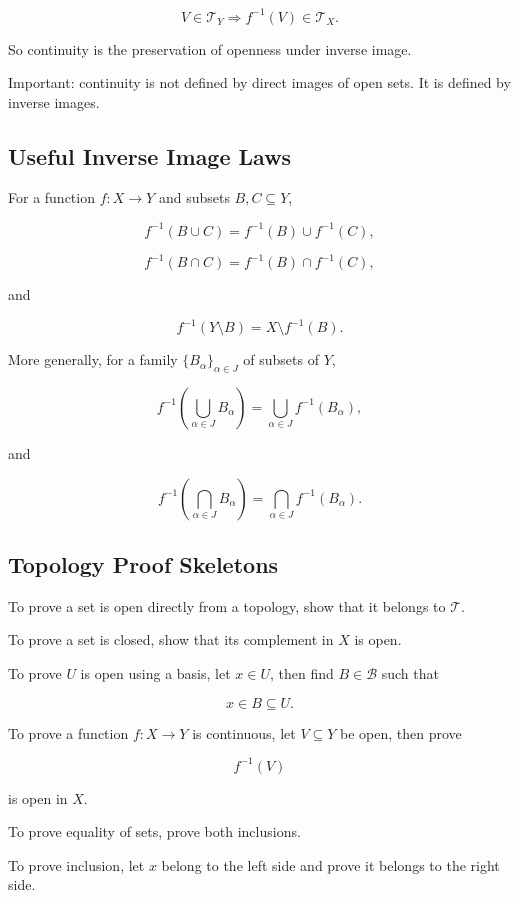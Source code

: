 \documentclass{article}
\begin{document}
	$$
	V\in\mathcal{T}_Y
	\Rightarrow
	f^{-1}(V)\in\mathcal{T}_X.
	$$
	
	So continuity is the preservation of openness under inverse image.
	
	Important: continuity is not defined by direct images of open sets. It is defined by inverse images.
	
	\subsection{Useful Inverse Image Laws}
	
	For a function \(f:X\to Y\) and subsets \(B,C\subseteq Y\),
	
	$$
	f^{-1}(B\cup C)=f^{-1}(B)\cup f^{-1}(C),
	$$
	
	$$
	f^{-1}(B\cap C)=f^{-1}(B)\cap f^{-1}(C),
	$$
	
	and
	
	$$
	f^{-1}(Y\setminus B)=X\setminus f^{-1}(B).
	$$
	
	More generally, for a family \(\{B_\alpha\}_{\alpha\in J}\) of subsets of \(Y\),
	
	$$
	f^{-1}\left(\bigcup_{\alpha\in J}B_\alpha\right)
	=
	\bigcup_{\alpha\in J}f^{-1}(B_\alpha),
	$$
	
	and
	
	$$
	f^{-1}\left(\bigcap_{\alpha\in J}B_\alpha\right)
	=
	\bigcap_{\alpha\in J}f^{-1}(B_\alpha).
	$$
	
	\subsection{Topology Proof Skeletons}
	
	To prove a set is open directly from a topology, show that it belongs to \(\mathcal{T}\).
	
	To prove a set is closed, show that its complement in \(X\) is open.
	
	To prove \(U\) is open using a basis, let \(x\in U\), then find \(B\in\mathcal{B}\) such that
	
	$$
	x\in B\subseteq U.
	$$
	
	To prove a function \(f:X\to Y\) is continuous, let \(V\subseteq Y\) be open, then prove
	
	$$
	f^{-1}(V)
	$$
	
	is open in \(X\).
	
	To prove equality of sets, prove both inclusions.
	
	To prove inclusion, let \(x\) belong to the left side and prove it belongs to the right side.
	
\end{document}
